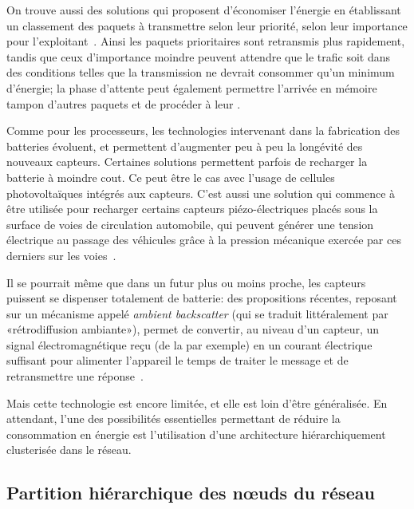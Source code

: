 On trouve aussi des solutions qui proposent d'économiser l'énergie en établissant un classement des paquets à transmettre selon leur priorité, \cad selon leur importance pour l'exploitant~\cite{SAS14}.
Ainsi les paquets prioritaires sont retransmis plus rapidement, tandis que ceux d'importance moindre peuvent attendre que le trafic soit dans des conditions telles que la transmission ne devrait consommer qu'un minimum d'énergie; la phase d'attente peut également permettre l'arrivée en mémoire tampon d'autres paquets et de procéder à leur .

Comme pour les processeurs, les technologies intervenant dans la fabrication des batteries évoluent, et permettent d'augmenter peu à peu la longévité des nouveaux capteurs.
Certaines solutions permettent parfois de recharger la batterie à moindre cout.
Ce peut être le cas avec l'usage de cellules photovoltaïques intégrés aux capteurs.
C'est aussi une solution qui commence à être utilisée pour recharger certains capteurs piézo-électriques placés sous la surface de voies de circulation automobile, qui peuvent générer une tension électrique au passage des véhicules grâce à la pression mécanique exercée par ces derniers sur les voies~\cite{sti}.

Il se pourrait même que dans un futur plus ou moins proche, les capteurs puissent se dispenser totalement de batterie: des propositions récentes, reposant sur un mécanisme appelé \textit{ambient backscatter} (qui se traduit littéralement par «rétrodiffusion ambiante»), permet de convertir, au niveau d'un capteur, un signal électromagnétique reçu (de la \sdb par exemple) en un courant électrique suffisant pour alimenter l'appareil le temps de traiter le message et de retransmettre une réponse~\cite{LPTGWS13}.

Mais cette technologie est encore limitée, et elle est loin d'être généralisée.
En attendant, l'une des possibilités essentielles permettant de réduire la consommation en énergie est l'utilisation d'une architecture  hiérarchiquement clusterisée dans le réseau.
\pagebreak %

    \subsection{Partition hiérarchique des nœuds du réseau}\label{st:subsec:partition}
